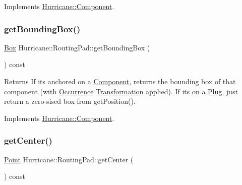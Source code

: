 Implements \mbox{\hyperlink{classHurricane_1_1Component_a727da3f127c3a7a0a09468219f98c3e6}{Hurricane\+::\+Component}}.

\mbox{\label{classHurricane_1_1RoutingPad_a2cc2894b5e1c82b725dedcf1978dc773}} 
\subsubsection{\texorpdfstring{get\+Bounding\+Box()}{getBoundingBox()}}
{\footnotesize\ttfamily \mbox{\hyperlink{classHurricane_1_1Box}{Box}} Hurricane\+::\+Routing\+Pad\+::get\+Bounding\+Box (\begin{DoxyParamCaption}{ }\end{DoxyParamCaption}) const\hspace{0.3cm}{\ttfamily [virtual]}}

\begin{DoxyReturn}{Returns}
If it\textquotesingle{}s anchored on a \mbox{\hyperlink{classHurricane_1_1Component}{Component}}, returns the bounding box of that component (with \mbox{\hyperlink{classHurricane_1_1Occurrence}{Occurrence}} \mbox{\hyperlink{classHurricane_1_1Transformation}{Transformation}} applied). If it\textquotesingle{}s on a \mbox{\hyperlink{classHurricane_1_1Plug}{Plug}}, just return a zero-\/sised box from get\+Position(). 
\end{DoxyReturn}


Implements \mbox{\hyperlink{classHurricane_1_1Component}{Hurricane\+::\+Component}}.

\mbox{\label{classHurricane_1_1RoutingPad_ad254b92749146a0eaaa7ed8f33fac4da}} 
\subsubsection{\texorpdfstring{get\+Center()}{getCenter()}}
{\footnotesize\ttfamily \mbox{\hyperlink{classHurricane_1_1Point}{Point}} Hurricane\+::\+Routing\+Pad\+::get\+Center (\begin{DoxyParamCaption}{ }\end{DoxyParamCaption}) const\hspace{0.3cm}{\ttfamily [virtual]}}

